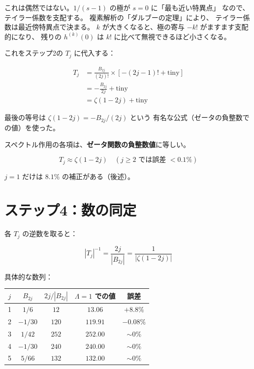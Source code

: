 \documentclass[11pt,a4paper]{article}
\begin{document}
\begin{deepbox}
これは偶然ではない。$1/(s-1)$ の極が $s = 0$ に「最も近い特異点」
なので、テイラー係数を支配する。
複素解析の「ダルブーの定理」により、
テイラー係数は最近傍特異点で決まる。
$k$ が大きくなると、極の寄与 $-k!$ がますます支配的になり、
残りの $h^{(k)}(0)$ は $k!$ に比べて無視できるほど小さくなる。
\end{deepbox}

これをステップ2の $T_j$ に代入する：

\begin{align*}
T_j &= \frac{B_{2j}}{(2j)!} \times [-(2j-1)! + \text{tiny}] \\
&= -\frac{B_{2j}}{2j} + \text{tiny} \\
&= \zeta(1-2j) + \text{tiny}
\end{align*}

最後の等号は $\zeta(1-2j) = -B_{2j}/(2j)$ という
有名な公式（ゼータの負整数での値）を使った。

\begin{resultbox}
スペクトル作用の各項は、\textbf{ゼータ関数の負整数値}に等しい。

$$T_j \approx \zeta(1-2j) \quad (j \geq 2 \text{ では誤差 } < 0.1\%)$$

$j = 1$ だけは $8.1\%$ の補正がある（後述）。
\end{resultbox}

\section{ステップ4：数の同定}

各 $T_j$ の逆数を取ると：

$$|T_j|^{-1} = \frac{2j}{|B_{2j}|} = \frac{1}{|\zeta(1-2j)|}$$

具体的な数列：

\begin{center}
\renewcommand{\arraystretch}{1.3}
\begin{tabular}{c|c|c|c|c}
$j$ & $B_{2j}$ & $2j/|B_{2j}|$ & $\Lambda=1$ での値 & 誤差 \\
\hline
1 & $1/6$ & $12$ & $13.06$ & $+8.8\%$ \\
2 & $-1/30$ & $120$ & $119.91$ & $-0.08\%$ \\
3 & $1/42$ & $252$ & $252.00$ & $\sim 0\%$ \\
4 & $-1/30$ & $240$ & $240.00$ & $\sim 0\%$ \\
5 & $5/66$ & $132$ & $132.00$ & $\sim 0\%$
\end{tabular}
\end{center}
\end{document}
